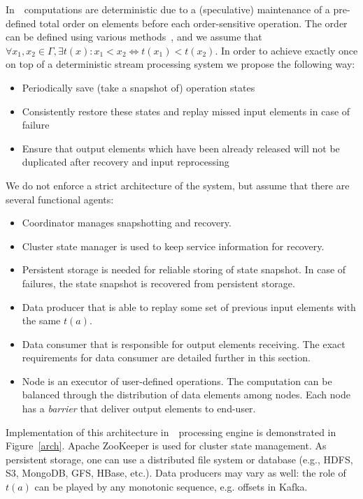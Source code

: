 In~\FlameStream\, computations are deterministic due to a (speculative) maintenance of a pre-defined total order on elements before each order-sensitive operation. The order can be defined using various methods~\cite{we2018seim}, and we assume that $\forall x_1,x_2\in \Gamma, \exists t(x): x_1 < x_2 \Longleftrightarrow t(x_1) < t(x_2)$. In order to achieve exactly once on top of a deterministic stream processing system we propose the following way:
\begin{itemize}
    \item Periodically save (take a snapshot of) operation states
    \item Consistently restore these states and replay missed input elements in case of failure
    \item Ensure that output elements which have been already released will not be duplicated after recovery and input reprocessing
\end{itemize}

We do not enforce a strict architecture of the system, but assume that there are several functional agents:
\begin{itemize}
    \item Coordinator manages snapshotting and recovery.
    \item Cluster state manager is used to keep service information for recovery.
    \item Persistent storage is needed for reliable storing of state snapshot. In case of failures, the state snapshot is recovered from persistent storage.
    \item Data producer that is able to replay some set of previous input elements with the same $t(a)$.
    \item Data consumer that is responsible for output elements receiving. The exact requirements for data consumer are detailed further in this section.
    \item Node is an executor of user-defined operations. The computation can be balanced through the distribution of data elements among nodes. Each node has a {\em barrier} that deliver output elements to end-user.
\end{itemize}

Implementation of this architecture in~\FlameStream\ processing engine is demonstrated in Figure~\ref{arch}. Apache ZooKeeper is used for cluster state management. As persistent storage, one can use a distributed file system or database (e.g., HDFS, S3, MongoDB, GFS, HBase, etc.). Data producers may vary as well: the role of $t(a)$ can be played by any monotonic sequence, e.g. offsets in Kafka.

